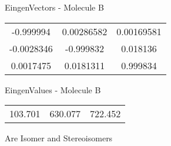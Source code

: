 \begin{multicols}{2}
\begin{center}
\vtab
 EingenVectors - Molecule B     \\
\vtab
\begin{tabular}{|c c c|}
-0.999994	 & 	0.00286582	 & 	0.00169581	 \\
-0.0028346	 & 	-0.999832	 & 	0.018136	 \\
0.0017475	 & 	0.0181311	 & 	0.999834
\end{tabular}

\vtab
 EingenValues - Molecule B     \\
\vtab
\begin{tabular}{|c c c|}
103.701	 & 	630.077	 & 	722.452
\end{tabular}

\end{center}
\end{multicols}
\begin{center}
\vtab
\vtab
\textcolor{NavyBlue}{\Large Are Isomer and Stereoisomers}
\end{center}
\newpage

